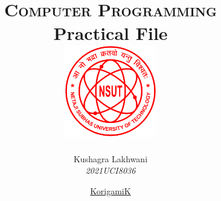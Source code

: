 \newcommand{\hmwkTitle}{Practical File} %
\newcommand{\hmwkClass}{Computer Programming} %
\newcommand{\hmwkDueDate}{Due\ Date} %

\date{\vfill \href{https://github.com/KorigamiK/CS-Assignments/}{KorigamiK}}

\title{
    \vspace{2in}
    \LARGE{\textsc{\hmwkClass}}\\
    \normalsize\vspace{0.1in}\small{\hmwkTitle}\\
    \vspace{1in}
    \includegraphics[width=0.3\textwidth]{./Images/NSUT.png}\\[0.1in]
    \vspace{0.7in}
}

\newcommand{\hmwkAuthorNameOne}{Kushagra Lakhwani}
\newcommand{\hmwkAuthorNumberOne}{2021UCI8036}

\author{
    \textmd{\hmwkAuthorNameOne}\\
    \textit{\hmwkAuthorNumberOne}
}
